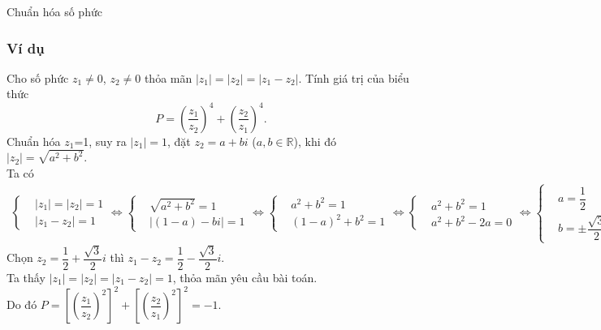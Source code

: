 \begin{dang}{Chuẩn hóa số phức}
	
\end{dang}

\subsubsection{Ví dụ}

\begin{vd}%
	Cho số phức $z_1 \neq 0$, $z_2 \neq 0$ thỏa mãn $|z_1|=|z_2|=|z_1-z_2|$. Tính giá trị của biểu thức $$P=\left(\dfrac{z_1}{z_2}\right)^4 + \left(\dfrac{z_2}{z_1}\right)^4.$$ 
	\loigiai
	{
		Chuẩn hóa $z_1$=1, suy ra $|z_1|=1$, đặt $z_2=a+bi$ ($a,b \in \mathbb{R}$), khi đó $|z_2|=\sqrt{a^2+b^2}$.\\
		Ta có
		\begin{eqnarray*}
			\left\{\begin{aligned}&|z_1|=|z_2|=1 \\&|z_1-z_2|=1\end{aligned}\right. \Leftrightarrow \left\{\begin{aligned}&\sqrt{a^2+b^2}=1 \\&|(1-a)-bi|=1\end{aligned}\right. \Leftrightarrow \left\{\begin{aligned}&a^2+b^2=1 \\&(1-a)^2+b^2=1\end{aligned}\right. \Leftrightarrow \left\{\begin{aligned}&a^2+b^2=1 \\&a^2+b^2-2a=0\end{aligned}\right. \Leftrightarrow \left\{\begin{aligned}&a=\dfrac{1}{2} \\&b=\pm\dfrac{\sqrt{3}}{2}.\end{aligned}\right.
		\end{eqnarray*}
		Chọn $z_2=\dfrac{1}{2}+\dfrac{\sqrt{3}}{2}i$ thì $z_1-z_2 = \dfrac{1}{2}-\dfrac{\sqrt{3}}{2}i$.\\
		Ta thấy $|z_1|=|z_2|=|z_1-z_2|=1$, thỏa mãn yêu cầu bài toán.\\
		Do đó $P = \left[\left(\dfrac{z_1}{z_2}\right)^2\right]^2 + \left[\left(\dfrac{z_2}{z_1}\right)^2\right]^2 = -1$.
	}
\end{vd}

